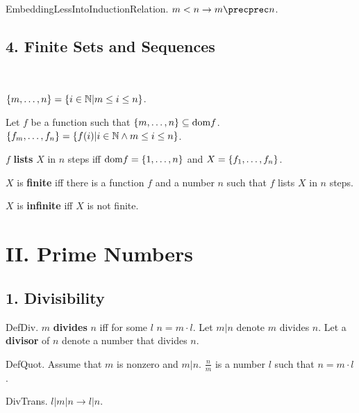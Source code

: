 \begin{axiom} EmbeddingLessIntoInductionRelation. $m < n \rightarrow m \precprec n$. \end{axiom}

\subsection{4. Finite Sets and Sequences}


\begin{definitions}\\
\begin{enumerate}
 
 $\{m,\dots,n\} = \{ i \in {\Bbb N} | m \leq i \leq n \}$.

Let $f$ be a function such that 
$\{m,\dots,n\} \subseteq \text{dom} f$. 
$\{f_{m},\dots,f_{n}\} = \{ f(i) | i \in {\Bbb N} \wedge m \leq i \leq n \}$.

 $f$ {\bf lists} $X$ in $n$ steps iff 
$\text{dom} f = \{1,\dots,n\}$ and $X = \{f_{1},\dots,f_{n}\}$.

 $X$ is {\bf finite} iff there is a function
$f$ and a number $n$ such that $f$ lists $X$ in $n$ steps.

 $X$ is {\bf infinite} iff $X$ is not finite.
\end{enumerate}
\end{definitions}

\section{II. Prime Numbers}

\subsection{1. Divisibility}


\begin{definition} DefDiv.
$m$ {\bf divides} $n$ iff for some $l$ $n = m \cdot l$.
Let $m | n$ denote $m$ divides $n$.
Let a {\bf divisor} of $n$ denote a number that divides $n$.
\end{definition}

\begin{definition} DefQuot.
Assume that $m$ is nonzero and $m | n$.
$\frac{n}{m}$ is a number $l$ such that $n = m \cdot l$.
\end{definition}

\begin{lemma} DivTrans. $l | m | n \rightarrow l | n$.
\end{lemma}

